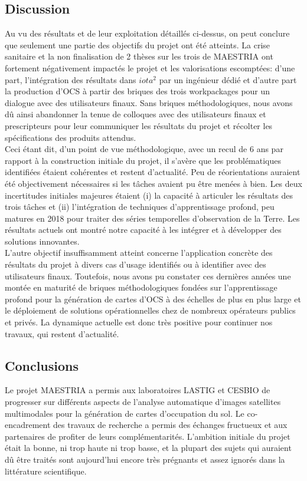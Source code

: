 \subsection{Discussion} 
Au vu des résultats et de leur exploitation détaillés ci-dessus, on peut conclure que seulement une partie des objectifs du projet ont été atteints. La crise sanitaire et la non finalisation de 2 thèses sur les trois de MAESTRIA ont fortement négativement impactés le projet et les valorisations escomptées: d'une part, l'intégration des résultats dans $iota^2$ par un ingénieur dédié et d'autre part la production d'OCS à partir des briques des trois workpackages pour un dialogue avec des utilisateurs finaux. Sans briques méthodologiques, nous avons dû ainsi abandonner la tenue de colloques avec des utilisateurs finaux et prescripteurs pour leur communiquer les résultats du projet et récolter les spécifications des produits attendus.\\ 

Ceci étant dit, d'un point de vue méthodologique, avec un recul de 6 ans par rapport à la construction initiale du projet, il s'avère que les problématiques identifiées étaient cohérentes et restent d'actualité. Peu de réorientations auraient été objectivement nécessaires si les tâches avaient pu être menées à bien. Les deux incertitudes initiales majeures étaient (i) la capacité à articuler les résultats des trois tâches et (ii) l'intégration de techniques d'apprentissage profond, peu matures en 2018 pour traiter des séries temporelles d'observation de la Terre. Les résultats actuels ont montré notre capacité à les intégrer et à développer des solutions innovantes.\\

L’autre objectif insuffisamment atteint concerne l’application concrète des résultats du projet à divers cas d’usage identifiés ou à identifier avec des utilisateurs finaux. Toutefois, nous avons pu constater ces dernières années une montée en maturité de briques méthodologiques fondées sur l'apprentissage profond pour la génération de cartes d'OCS à des échelles de plus en plus large et le déploiement de solutions opérationnelles chez de nombreux opérateurs publics et privés. La dynamique actuelle est donc très positive pour continuer nos travaux, qui restent d'actualité.

\subsection{Conclusions}
Le projet MAESTRIA a permis aux laboratoires LASTIG et CESBIO de progresser sur différents aspects de l'analyse automatique d'images satellites multimodales pour la génération de cartes d'occupation du sol. Le co-encadrement des travaux de recherche a permis des échanges fructueux et aux partenaires de profiter de leurs complémentarités. L'ambition initiale du projet était la bonne, ni trop haute ni trop basse, et la plupart des sujets qui auraient dû être traités sont aujourd'hui encore très prégnants et assez ignorés dans la littérature scientifique.

